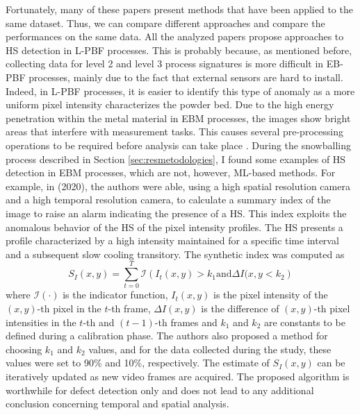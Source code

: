 Fortunately, many of these papers present methods that have been applied to the same dataset. Thus, we can compare different approaches and compare the performances on the same data. All the analyzed papers propose approaches to HS detection in L-PBF processes. This is probably because, as mentioned before, collecting data for level 2 and level 3 process signatures is more difficult in EB-PBF processes, mainly due to the fact that external sensors are hard to install. Indeed, in L-PBF processes, it is easier to identify this type of anomaly as a more uniform pixel intensity characterizes the powder bed. Due to the high energy penetration within the metal material in EBM processes, the images show bright areas that interfere with measurement tasks. This causes several pre-processing operations to be required before analysis can take place \cite{grasso_powder_2020}. During the snowballing process described in Section \ref{sec:resmetodologies}, I found some examples of HS detection in EBM processes, which are not, however, ML-based methods. For example, in \citeauthor{grasso_powder_2020} (2020), the authors were able, using a high spatial resolution camera and a high temporal resolution camera, to calculate a summary index of the image to raise an alarm indicating the presence of a HS. This index exploits the anomalous behavior of the HS of the pixel intensity profiles. The HS presents a profile characterized by a high intensity maintained for a specific time interval and a subsequent slow cooling transitory. The synthetic index was computed as 
\begin{equation}
    \label{eq:sinteticgrassohs}
    S_I(x, y)=\sum_{t=0}^T \mathcal{I}\left( I_t(x, y) > k_1 \text{and} \Delta I(x, y<k_2 \right)
\end{equation}
where $\mathcal{I}(\cdot)$ is the indicator function, $I_t(x, y)$ is the pixel intensity of the $(x, y)$-th pixel in the $t$-th frame, $\Delta I(x, y)$ is the difference of $(x, y)$-th pixel intensities in the $t$-th and $(t-1)$-th frames and $k_1$ and $k_2$ are constants to be defined during a calibration phase. The authors also proposed a method for choosing $k_1$ and $k_2$ values, and for the data collected during the study, these values were set to 90\% and 10\%, respectively. The estimate of $S_I(x, y)$ can be iteratively updated as new video frames are acquired. The proposed algorithm is worthwhile for defect detection only and does not lead to any additional conclusion concerning temporal and spatial analysis.

